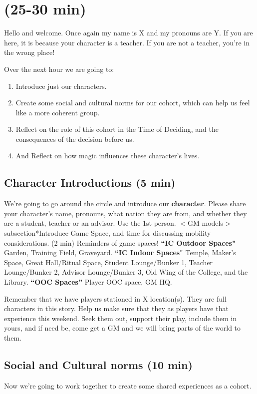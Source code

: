 \documentclass[green]{GL2020}
\begin{document}
\name{\gPreGameTeacher{}}

\section*{(25-30 min)}

Hello and welcome. Once again my name is X and my pronouns are Y. If you are here, it is because your character is a teacher. If you are not a teacher, you're in the wrong place!

Over the next hour we are going to:
\begin{enumerate}
	\item Introduce just our characters.
	\item Create some social and cultural norms for our cohort, which can help us feel like a more coherent group.
	\item Reflect on the role of this cohort in the Time of Deciding, and the consequences of the decision before us.
	\item And Reflect on how magic influences these character’s lives.
\end{enumerate}

\subsection*{Character Introductions (5 min)}
We’re going to go around the circle and introduce our \textbf{character}. Please share your character’s name, pronouns, what nation they are from, and whether they are a student, teacher or an advisor. Use the 1st person. $<$GM models$>$
\\subsection*{Introduce Game Space, and time for discussing mobility considerations. (2 min)}
Reminders of game spaces!
\textbf{``IC Outdoor Spaces"} Garden, Training Field, Graveyard. 
\textbf{``IC Indoor Spaces"} Temple, Maker's Space, Great Hall/Ritual Space, Student Lounge/Bunker 1, Teacher Lounge/Bunker 2, Advisor Lounge/Bunker 3, Old Wing of the College, and the Library.
\textbf{``OOC Spaces''} Player OOC space, GM HQ.

Remember that we have players stationed in X location(s). They are full characters in this story. Help us make sure that they as players have that experience this weekend. Seek them out, support their play, include them in yours, and if need be, come get a GM and we will bring parts of the world to them.

\subsection*{Social and Cultural norms (10 min)}
Now we’re going to work together to create some shared experiences as a cohort.
\end{document}
